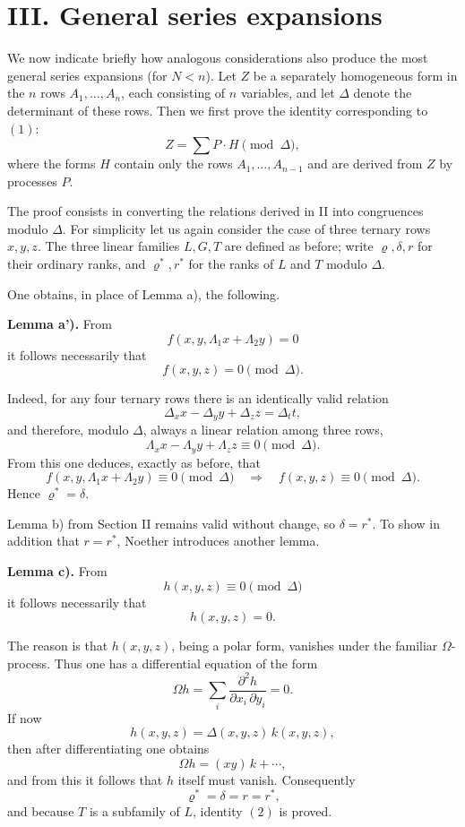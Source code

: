 \documentclass[11pt]{article}
\begin{document}
\section*{III. General series expansions}

We now indicate briefly how analogous considerations also produce the most general series expansions (for \(N<n\)). Let \(Z\) be a separately homogeneous form in the \(n\) rows \(A_1,\dots,A_n\), each consisting of \(n\) variables, and let \(\Delta\) denote the determinant of these rows. Then we first prove the identity corresponding to \((1)\):
\[
Z=\sum P\cdot H \pmod{\Delta},
\tag{2}
\]
where the forms \(H\) contain only the rows \(A_1,\dots,A_{n-1}\) and are derived from \(Z\) by processes \(P\).

The proof consists in converting the relations derived in II into congruences modulo \(\Delta\). For simplicity let us again consider the case of three ternary rows \(x,y,z\). The three linear families \(L,G,T\) are defined as before; write \(\varrho,\delta,r\) for their ordinary ranks, and \(\varrho^*,r^*\) for the ranks of \(L\) and \(T\) modulo \(\Delta\).

One obtains, in place of Lemma a), the following.

\medskip
\noindent\textbf{Lemma a').}
From
\[
f(x,y,\Lambda_1x+\Lambda_2y)=0
\]
it follows necessarily that
\[
f(x,y,z)=0\pmod{\Delta}.
\]

Indeed, for any four ternary rows there is an identically valid relation
\[
\Delta_x x-\Delta_y y+\Delta_z z=\Delta_t t,
\]
and therefore, modulo \(\Delta\), always a linear relation among three rows,
\[
\Lambda_x x-\Lambda_y y+\Lambda_z z\equiv 0 \pmod{\Delta}.
\]
From this one deduces, exactly as before, that
\[
f(x,y,\Lambda_1x+\Lambda_2y)\equiv 0 \pmod{\Delta}
\quad\Rightarrow\quad
f(x,y,z)\equiv 0 \pmod{\Delta}.
\]
Hence \(\varrho^*=\delta\).

Lemma b) from Section II remains valid without change, so \(\delta=r^*\). To show in addition that \(r=r^*\), Noether introduces another lemma.

\medskip
\noindent\textbf{Lemma c).}
From
\[
h(x,y,z)\equiv 0 \pmod{\Delta}
\]
it follows necessarily that
\[
h(x,y,z)=0.
\]

The reason is that \(h(x,y,z)\), being a polar form, vanishes under the familiar \(\Omega\)-process. Thus one has a differential equation of the form
\[
\Omega h=\sum_i \frac{\partial^2 h}{\partial x_i\,\partial y_i}=0.
\]
If now
\[
h(x,y,z)=\Delta(x,y,z)\,k(x,y,z),
\]
then after differentiating one obtains
\[
\Omega h=(xy)\,k+\cdots,
\]
and from this it follows that \(h\) itself must vanish. Consequently
\[
\varrho^*=\delta=r=r^*,
\]
and because \(T\) is a subfamily of \(L\), identity \((2)\) is proved.
\end{document}
